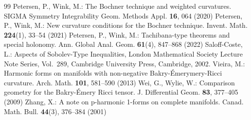 \documentclass[10pt,a4paper]{amsart}
\numberwithin{equation}{section}
\begin{document}
\begin{thebibliography}{99}
 Petersen, P., Wink, M.: The Bochner technique and weighted curvatures. SIGMA Symmetry Integrability Geom. Methods Appl. {\bf 16}, 064 (2020)
 Petersen, P., Wink, M.: New curvature conditions for the Bochner technique. Invent. Math. {\bf 224}(1), 33–54 (2021)
 Petersen, P., Wink, M.: Tachibana-type theorems and special holonomy. Ann. Global Anal. Geom. \textbf{61}(4), 847--868 (2022)
 Saloff-Coste, L.: Aspects of Sobolev-Type Inequalities, London Mathematical Society Lecture Note Series, Vol.~289, Cambridge University Press, Cambridge, 2002.
 Vieira, M.: Harmonic forms on manifolds with non-negative Bakry-Émerymery-Ricci curvature. Arch. Math. \textbf{101}, 581–590 (2013)
 Wei, G., Wylie, W.: Comparison geometry for the Bakry-Émery Ricci tensor. J. Differential Geom. \textbf{83}, 377–405 (2009)
 Zhang, X.: A note on p-harmonic 1-forms on complete manifolds. Canad. Math. Bull. \textbf{44}(3), 376--384 (2001)
\end{thebibliography}
\end{document}
